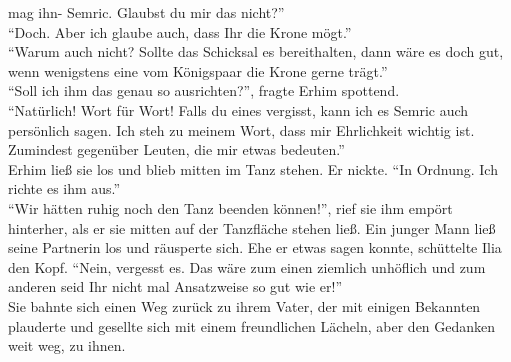 mag ihn- Semric. Glaubst du mir das nicht?''\\
``Doch. Aber ich glaube auch, dass Ihr die Krone mögt.''\\
``Warum auch nicht? Sollte das Schicksal es bereithalten, dann wäre es doch gut, wenn wenigstens 
eine vom Königspaar die Krone gerne trägt.''\\
``Soll ich ihm das genau so ausrichten?'', fragte Erhim spottend.\\
``Natürlich! Wort für Wort! Falls du eines vergisst, kann ich es Semric auch persönlich sagen. Ich 
steh zu meinem Wort, dass mir Ehrlichkeit wichtig ist. Zumindest gegenüber Leuten, die mir etwas 
bedeuten.''\\
Erhim ließ sie los und blieb mitten im Tanz stehen. Er nickte. ``In Ordnung. Ich richte es ihm 
aus.''\\
``Wir hätten ruhig noch den Tanz beenden können!'', rief sie ihm empört hinterher, als er sie 
mitten auf der Tanzfläche stehen ließ. Ein junger Mann ließ seine Partnerin los und räusperte sich. 
Ehe er etwas sagen konnte, schüttelte Ilia den Kopf. ``Nein, vergesst es. Das wäre zum einen 
ziemlich unhöflich und zum anderen seid Ihr nicht mal Ansatzweise so gut wie er!''\\
Sie bahnte sich einen Weg zurück zu ihrem Vater, der mit einigen Bekannten plauderte und gesellte 
sich mit einem freundlichen Lächeln, aber den Gedanken weit weg, zu ihnen.\\

